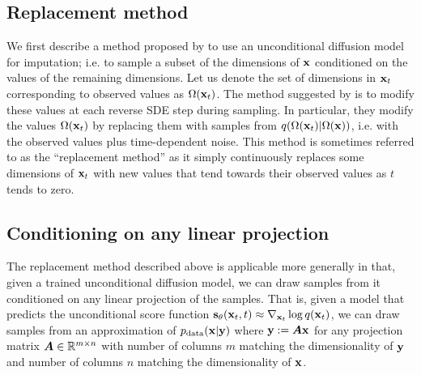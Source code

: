 \subsection{Replacement method}
We first describe a method proposed by \citet{song2020score} to use an unconditional diffusion model for imputation; i.e. to sample a subset of the dimensions of ${\mathbf{x}}$ conditioned on the values of the remaining dimensions. Let us denote the set of dimensions in ${\mathbf{x}}_t$ corresponding to observed values as $\Omega({\mathbf{x}}_t)$. The method suggested by \citet{song2020score} is to modify these values at each reverse SDE step during sampling. In particular, they modify the values $\Omega({\mathbf{x}}_t)$ by replacing them with samples from $q(\Omega({\mathbf{x}}_t) | \Omega({\mathbf{x}}))$, i.e. with the observed values plus time-dependent noise. This method is sometimes referred to as the ``replacement method'' as it simply continuously replaces some dimensions of ${\mathbf{x}}_t$ with new values that tend towards their observed values as $t$ tends to zero.

\subsection{Conditioning on any linear projection}
The replacement method described above is applicable more generally in that, given a trained unconditional diffusion model, we can draw samples from it conditioned on any linear projection of the samples. That is, given a model that predicts the unconditional score function ${\mathbf{s}}_\theta({\mathbf{x}}_t, t) \approx \nabla_{{\mathbf{x}}_t} \log q({\mathbf{x}}_t)$, we can draw samples from an approximation of $p_{\rm{data}}({\mathbf{x}}|{\mathbf{y}})$ where ${\mathbf{y}}:={\bm{A}}{\mathbf{x}}$ for any projection matrix ${\bm{A}} \in \mathbb{R}^{m \times n}$ with number of columns $m$ matching the dimensionality of ${\mathbf{y}}$ and number of columns $n$ matching the dimensionality of ${\mathbf{x}}$.

